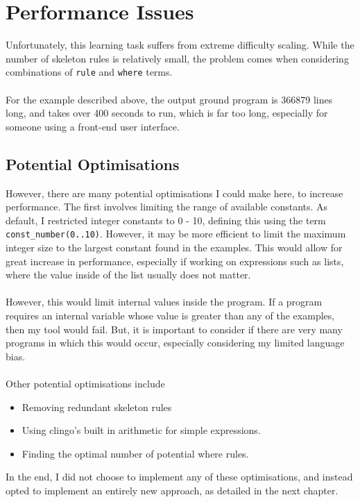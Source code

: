 \section{Performance Issues}
Unfortunately, this learning task suffers from extreme difficulty scaling. While the number of skeleton rules is relatively small, the problem comes when considering combinations of \lstinline{rule} and \lstinline{where} terms.\\ \\ %
For the example described above, the output ground program is 366879 lines long, and takes over 400 seconds to run, which is far too long, especially for someone using a front-end user interface.

\subsection{Potential Optimisations}
However, there are many potential optimisations I could make here, to increase performance. The first involves limiting the range of available constants. As default, I restricted integer constants to 0 - 10, defining this using the term \lstinline{const_number(0..10)}. However, it may be more efficient to limit the maximum integer size to the largest constant found in the examples. This would allow for great increase in performance, especially if working on expressions such as lists, where the value inside of the list usually does not matter. \\ \\ %
However, this would limit internal values inside the program. If a program requires an internal variable whose value is greater than any of the examples, then my tool would fail. But, it is important to consider if there are very many programs in which this would occur, especially considering my limited language bias. \\ \\
Other potential optimisations include
\begin{itemize}
\item Removing redundant skeleton rules
\item Using clingo's built in arithmetic for simple expressions.
\item Finding the optimal number of potential where rules.
\end{itemize}
In the end, I did not choose to implement any of these optimisations, and instead opted to implement an entirely new approach, as detailed in the next chapter.

\pagebreak
%
%
